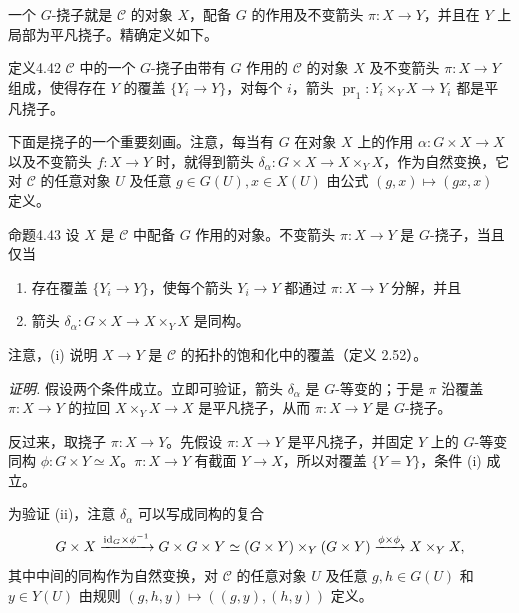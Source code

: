 一个 $G$-挠子就是 $\mathcal C$ 的对象 $X$，配备 $G$ 的作用及不变箭头 $\pi\colon X\to Y$，并且在 $Y$ 上局部为平凡挠子。精确定义如下。

\begin{origstatement}{定义}{4.42}\label{ch04:def442}
$\mathcal C$ 中的一个 $G$-挠子由带有 $G$ 作用的 $\mathcal C$ 的对象 $X$ 及不变箭头 $\pi\colon X\to Y$ 组成，使得存在 $Y$ 的覆盖 $\{Y_i\to Y\}$，对每个 $i$，箭头 $\operatorname{pr}_1\colon Y_i\times_Y X\to Y_i$ 都是平凡挠子。
\end{origstatement}

下面是挠子的一个重要刻画。注意，每当有 $G$ 在对象 $X$ 上的作用 $\alpha\colon G\times X\to X$ 以及不变箭头 $f\colon X\to Y$ 时，就得到箭头 $\delta_\alpha\colon G\times X\to X\times_Y X$，作为自然变换，它对 $\mathcal C$ 的任意对象 $U$ 及任意 $g\in G(U),x\in X(U)$ 由公式 $(g,x)\mapsto(gx,x)$ 定义。

\begin{origstatement}{命题}{4.43}\label{ch04:prop443}
设 $X$ 是 $\mathcal C$ 中配备 $G$ 作用的对象。不变箭头 $\pi\colon X\to Y$ 是 $G$-挠子，当且仅当
\begin{enumerate}
 \item[(i)] 存在覆盖 $\{Y_i\to Y\}$，使每个箭头 $Y_i\to Y$ 都通过 $\pi\colon X\to Y$ 分解，并且
 \item[(ii)] 箭头 $\delta_\alpha\colon G\times X\to X\times_Y X$ 是同构。
\end{enumerate}
\end{origstatement}
注意，(i) 说明 $X\to Y$ 是 $\mathcal C$ 的拓扑的饱和化中的覆盖（定义 2.52）。

\noindent\textit{证明.}
假设两个条件成立。立即可验证，箭头 $\delta_\alpha$ 是 $G$-等变的；于是 $\pi$ 沿覆盖 $\pi\colon X\to Y$ 的拉回 $X\times_Y X\to X$ 是平凡挠子，从而 $\pi\colon X\to Y$ 是 $G$-挠子。

反过来，取挠子 $\pi\colon X\to Y$。先假设 $\pi\colon X\to Y$ 是平凡挠子，并固定 $Y$ 上的 $G$-等变同构 $\phi\colon G\times Y\simeq X$。$\pi\colon X\to Y$ 有截面 $Y\to X$，所以对覆盖 $\{Y=Y\}$，条件 (i) 成立。

为验证 (ii)，注意 $\delta_\alpha$ 可以写成同构的复合
\[
 G\times X\xrightarrow{\mathrm{id}_G\times\phi^{-1}}G\times G\times Y
 \simeq(G\times Y)\times_Y(G\times Y)
 \xrightarrow{\phi\times\phi}X\times_Y X,
\]
其中中间的同构作为自然变换，对 $\mathcal C$ 的任意对象 $U$ 及任意 $g,h\in G(U)$ 和 $y\in Y(U)$ 由规则 $(g,h,y)\mapsto((g,y),(h,y))$ 定义。

